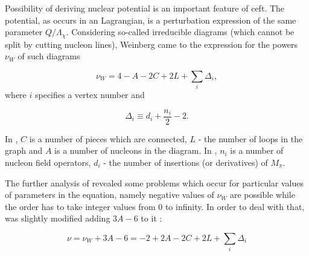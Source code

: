 Possibility of deriving nuclear potential is an important feature of \gls{ceft}.
The potential, as occurs in an Lagrangian, is a perturbation expression of the same parameter $Q/\Lambda_\chi$.
Considering so-called irreducible diagrams (which cannot be split
by cutting nucleon lines), Weinberg \cite{WEINBERG1990,WEINBERG1991}
came to the expression for the powers $\nu_W$ of such diagrams

\begin{equation}
    \nu_W = 4 - A - 2C + 2L + \sum_i \Delta_i,
    \label{powers}
\end{equation}
where $i$ specifies a vertex number and

\begin{equation}
    \Delta_i \equiv d_i + \frac{n_i}{2} - 2.
    \label{Delta}
\end{equation}

In , $C$ is a number of pieces which are connected, $L$ - the number of loops in the graph
and $A$ is a number of nucleons in the diagram.
In , $n_i$ is a number of nucleon field operators, $d_i$ - the number of insertions
(or derivatives) of  $M_\pi$.

The further analysis of  revealed some problems which occur 
for particular values of parameters in the equation, namely negative values of $\nu_W$ 
are possible while the order has to take integer values from 0 to infinity.
In order to deal with that,  
was slightly modified adding $3A - 6$ to it  \cite{Machleidt2011, EPELBAUM2006_PROGRESS}:

\begin{equation}
    \nu = \nu_W + 3A  - 6 = -2 + 2A - 2C + 2L + \sum_i \Delta_i
    \label{powers_corrected}
\end{equation}


